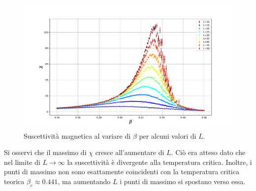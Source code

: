 \documentclass[10pt,a4paper]{article}
\begin{document}
\begin{figure}[h!]
	\centering
	\includegraphics[width=1\linewidth]{susc_beta.pdf}
	\caption{Suscettività magnetica al variare di $\beta$ per alcuni valori di $L$.}
	\label{suscettivitabeta}
\end{figure}
Si osservi che il massimo di $\chi$ cresce all'aumentare di $L$. Ciò era atteso dato che nel limite di $L\rightarrow\infty$ la suscettività è divergente alla temperatura critica. Inoltre, i punti di massimo non sono esattamente coincidenti con la temperatura critica teorica $\beta_c\approx0.441$, ma aumentando $L$ i punti di massimo si spostano verso essa.
\end{document}
